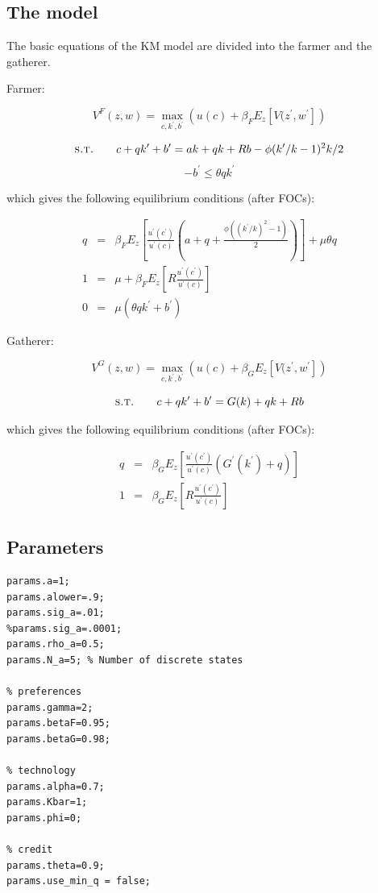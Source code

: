 \documentclass{article}
\begin{document}
\subsection*{The model}

The basic equations of the KM model are divided into the farmer and the gatherer.

Farmer:

$$ V^F(z,w) = \max_{c,k^{\prime},b^{\prime} } \left( u(c) + \beta_F E_z \left[ V(z^{\prime},w^{\prime} \right]  \right) $$

$$ \textsc{s.t.} \quad \quad c+qk^\prime+b^\prime = ak + qk +Rb - \phi(k^\prime/k - 1)^2k/2$$
$$-b^\prime \leq \theta qk^\prime $$

which gives the following equilibrium conditions (after FOCs):

\begin{eqnarray*}
 q & = & \beta_F E_z\left[ \frac{u^\prime(c^\prime)}{u^\prime(c)}(a+q+\frac{\phi((k^\prime/k)^2 -1)}{2})\right]+\mu \theta q\\
 1 & = & \mu + \beta_F E_z\left[R\frac{u^\prime(c^\prime)}{u^\prime(c)}\right] \\
 0 & = & \mu (\theta q k^\prime + b^\prime) 
\end{eqnarray*}

Gatherer:

$$ V^G(z,w) = \max_{c,k^{\prime},b^{\prime} } \left( u(c) + \beta_G E_z \left[ V(z^{\prime},w^{\prime} \right]  \right) $$

$$ \textsc{s.t.} \quad \quad c+qk^\prime+b^\prime = G(k) + qk +Rb$$

which gives the following equilibrium conditions (after FOCs):

\begin{eqnarray*}
 q & = & \beta_G E_z\left[ \frac{u^\prime(c^\prime)}{u^\prime(c)}\left(G^\prime(k^\prime)+q\right)\right]\\
 1 & = & \beta_G E_z\left[R\frac{u^\prime(c^\prime)}{u^\prime(c)}\right]
\end{eqnarray*}


\subsection*{Parameters}


\begin{verbatim}
params.a=1;
params.alower=.9;
params.sig_a=.01;
%params.sig_a=.0001;
params.rho_a=0.5;
params.N_a=5; % Number of discrete states

% preferences
params.gamma=2;
params.betaF=0.95;
params.betaG=0.98;

% technology
params.alpha=0.7;
params.Kbar=1;
params.phi=0;

% credit
params.theta=0.9;
params.use_min_q = false;
\end{verbatim}
\end{document}
